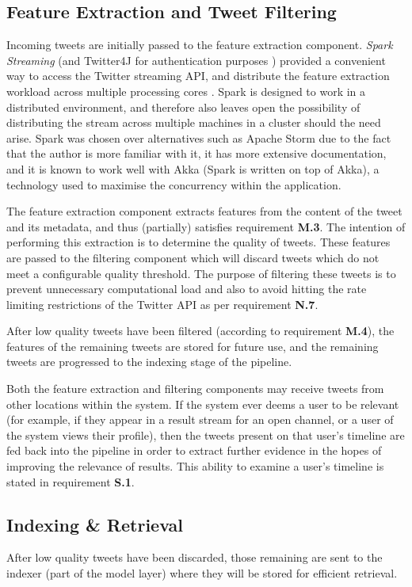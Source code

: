 \documentclass{l4proj}
\begin{document}
    \subsection{Feature Extraction and Tweet Filtering}
        Incoming tweets are initially passed to the feature extraction component. \textit{Spark Streaming} (and Twitter4J for authentication purposes \cite{twitter4j}) provided a convenient way to access the Twitter streaming API, and distribute the feature extraction workload across multiple processing cores \cite{sparkstreaming}. Spark is designed to work in a distributed environment, and therefore also leaves open the possibility of distributing the stream across multiple machines in a cluster should the need arise. Spark was chosen over alternatives such as Apache Storm due to the fact that the author is more familiar with it, it has more extensive documentation, and it is known to work well with Akka (Spark is written on top of Akka), a technology used to maximise the concurrency within the application.
        
        The feature extraction component extracts features from the content of the tweet and its metadata, and thus (partially) satisfies requirement \textbf{M.3}. The intention of performing this extraction is to determine the quality of tweets. These features are passed to the filtering component which will discard tweets which do not meet a configurable quality threshold. The purpose of filtering these tweets is to prevent unnecessary computational load and also to avoid hitting the rate limiting restrictions of the Twitter API as per requirement \textbf{N.7}.
        
        After low quality tweets have been filtered (according to requirement \textbf{M.4}), the features of the remaining tweets are stored for future use, and the remaining tweets are progressed to the indexing stage of the pipeline.

Both the feature extraction and filtering components may receive tweets from other locations within the system. If the system ever deems a user to be relevant (for example, if they appear in a result stream for an open channel, or a user of the system views their profile), then the tweets present on that user's timeline are fed back into the pipeline in order to extract further evidence in the hopes of improving the relevance of results. This ability to examine a user's timeline is stated in requirement \textbf{S.1}.

        \subsection{Indexing \& Retrieval}
        After low quality tweets have been discarded, those remaining are sent to the indexer (part of the model layer) where they will be stored for efficient retrieval. 
        
\end{document}
